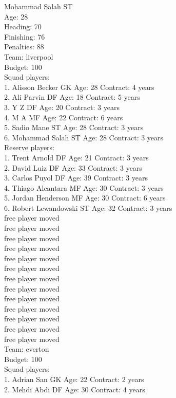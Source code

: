 \documentclass[]{article}
\begin{document}
{Mohammad Salah ST\\
Age: 28\\
Heading: 70\\
Finishing: 76\\
Penalties: 88\\
Team: liverpool\\
Budget: 100\\
Squad players:\\
1. Alisson Becker GK Age: 28 Contract: 4 years\\
2. Ali Parvin DF Age: 18 Contract: 5 years\\
3. Y Z DF Age: 20 Contract: 3 years\\
4. M A MF Age: 22 Contract: 6 years\\
5. Sadio Mane ST Age: 28 Contract: 3 years\\
6. Mohammad Salah ST Age: 28 Contract: 3 years\\
Reserve players:\\
1. Trent Arnold DF Age: 21 Contract: 3 years\\
2. David Luiz DF Age: 33 Contract: 3 years\\
3. Carlos Puyol DF Age: 39 Contract: 3 years\\
4. Thiago Alcantara MF Age: 30 Contract: 3 years\\
5. Jordan Henderson MF Age: 30 Contract: 6 years\\
6. Robert Lewandowski ST Age: 32 Contract: 3 years\\
free player moved\\
free player moved\\
free player moved\\
free player moved\\
free player moved\\
free player moved\\
free player moved\\
free player moved\\
free player moved\\
free player moved\\
free player moved\\
free player moved\\
free player moved\\
Team: everton\\
Budget: 100\\
Squad players:\\
1. Adrian San GK Age: 22 Contract: 2 years\\
2. Mehdi Abdi DF Age: 30 Contract: 4 years\\
}
\end{document}
